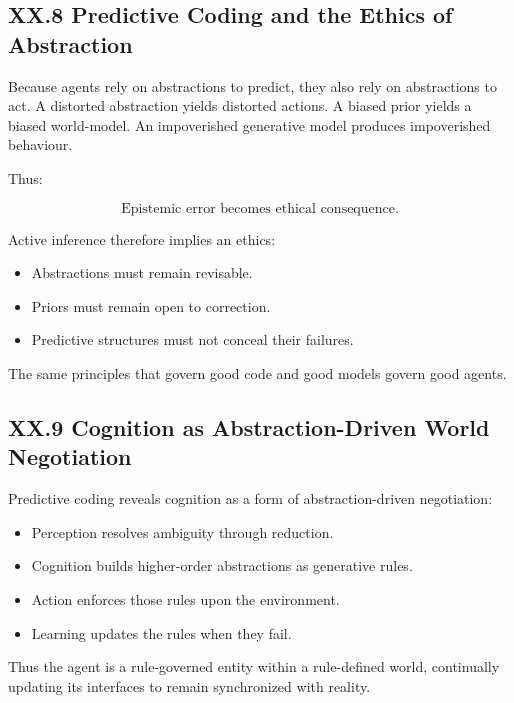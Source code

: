 \documentclass[11pt,letterpaper]{article}
\begin{document}
\subsection{XX.8 Predictive Coding and the Ethics of Abstraction}

Because agents rely on abstractions to predict, they also rely on abstractions to act.  
A distorted abstraction yields distorted actions.  
A biased prior yields a biased world-model.  
An impoverished generative model produces impoverished behaviour.

Thus:

\[
\text{Epistemic error becomes ethical consequence.}
\]

Active inference therefore implies an ethics:

\begin{itemize}
    \item Abstractions must remain revisable.
    \item Priors must remain open to correction.
    \item Predictive structures must not conceal their failures.
\end{itemize}

The same principles that govern good code and good models govern good agents.

\subsection{XX.9 Cognition as Abstraction-Driven World Negotiation}

Predictive coding reveals cognition as a form of abstraction-driven negotiation:

\begin{itemize}
    \item Perception resolves ambiguity through reduction.
    \item Cognition builds higher-order abstractions as generative rules.
    \item Action enforces those rules upon the environment.
    \item Learning updates the rules when they fail.
\end{itemize}

Thus the agent is a rule-governed entity within a rule-defined world, continually updating its interfaces to remain synchronized with reality.
\end{document}
